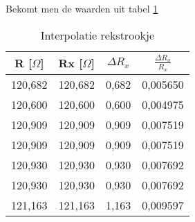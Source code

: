 Bekomt men de waarden uit tabel \ref{tab:interpol_rekstrookje}

\begin{table}[h]
    \centering
    \caption{Interpolatie rekstrookje}
    \label{tab:interpol_rekstrookje}
    \begin{tabular}{| c | c | c | c |}
        \hline
        R [$\Omega$]    & Rx [$\Omega$] & $\Delta R_{x}$    & $\frac{\Delta R_{x}}{R_{x}}$ \\ \hline
        120,682         & 120,682       & 0,682             & 0,005650 \\ \hline
        120,600         & 120,600       & 0,600             & 0,004975 \\ \hline
        120,909         & 120,909       & 0,909             & 0,007519 \\ \hline
        120,909         & 120,909       & 0,909             & 0,007519 \\ \hline
        120,930         & 120,930       & 0,930             & 0,007692 \\ \hline
        120,930         & 120,930       & 0,930             & 0,007692 \\ \hline
        121,163         & 121,163       & 1,163             & 0,009597 \\ \hline
    \end{tabular}
\end{table}
